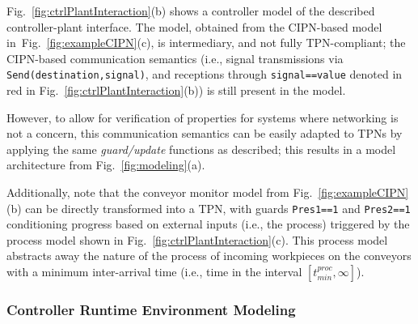 Fig.~\ref{fig:ctrlPlantInteraction}(b) shows a controller model of %
the described controller-plant interface. %
The model, obtained from the CIPN-based model in~Fig.~\ref{fig:exampleCIPN}(c), is intermediary, and not fully TPN-compliant; the CIPN-based communication semantics (i.e., signal transmissions via \verb!Send(destination,signal)!, and receptions through \verb!signal==value! denoted in red in Fig.~\ref{fig:ctrlPlantInteraction}(b)) is still present in the model. {However, to allow for verification of properties for systems where networking is not a concern, this communication semantics can be easily adapted to TPNs by applying the same \emph{guard/update} functions as described; this results in a model architecture from Fig.~\ref{fig:modeling}(a).

Additionally, note that the conveyor monitor model from Fig.~\ref{fig:exampleCIPN}(b) can be directly transformed into a TPN, with guards \verb!Pres1==1! and \verb!Pres2==1! conditioning progress based on external inputs (i.e., the process) triggered by the process model shown in Fig.~\ref{fig:ctrlPlantInteraction}(c). This process model abstracts away the nature of the process of incoming workpieces on the conveyors with a minimum inter-arrival time (i.e., time in the interval $[t_{min}^{proc},\infty]$). %

\subsubsection{Controller Runtime Environment Modeling}
\label{sec:runtimemodel}

}
